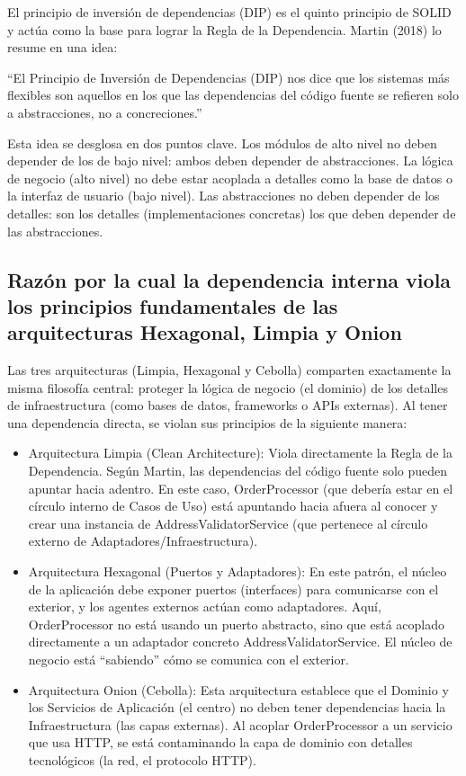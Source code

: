\documentclass[12pt, a4paper]{article}
\begin{document}
        El principio de inversión de dependencias (DIP) es el quinto principio de SOLID y actúa como la base para lograr la Regla de la Dependencia. Martin (2018) lo resume en una idea:

        “El Principio de Inversión de Dependencias (DIP) nos dice que los sistemas más flexibles son aquellos en los que las dependencias del código fuente se refieren solo a abstracciones, no a concreciones.”

        Esta idea se desglosa en dos puntos clave. Los módulos de alto nivel no deben depender de los de bajo nivel: ambos deben depender de abstracciones. La lógica de negocio (alto nivel) no debe estar acoplada a detalles como la base de datos o la interfaz de usuario (bajo nivel). Las abstracciones no deben depender de los detalles: son los detalles (implementaciones concretas) los que deben depender de las abstracciones.

        \subsection{Razón por la cual la dependencia interna viola los principios fundamentales de las arquitecturas Hexagonal, Limpia y Onion}

        Las tres arquitecturas (Limpia, Hexagonal y Cebolla) comparten exactamente la misma filosofía central: proteger la lógica de negocio (el dominio) de los detalles de infraestructura (como bases de datos, frameworks o APIs externas). Al tener una dependencia directa, se violan sus principios de la siguiente manera:
        \begin{itemize}   
            \item Arquitectura Limpia (Clean Architecture): Viola directamente la Regla de la Dependencia. Según Martin, las dependencias del código fuente solo pueden apuntar hacia adentro. En este caso, OrderProcessor (que debería estar en el círculo interno de Casos de Uso) está apuntando hacia afuera al conocer y crear una instancia de AddressValidatorService (que pertenece al círculo externo de Adaptadores/Infraestructura).
            \item Arquitectura Hexagonal (Puertos y Adaptadores): En este patrón, el núcleo de la aplicación debe exponer puertos (interfaces) para comunicarse con el exterior, y los agentes externos actúan como adaptadores. Aquí, OrderProcessor no está usando un puerto abstracto, sino que está acoplado directamente a un adaptador concreto AddressValidatorService. El núcleo de negocio está ``sabiendo'' cómo se comunica con el exterior.
            \item Arquitectura Onion (Cebolla): Esta arquitectura establece que el Dominio y los Servicios de Aplicación (el centro) no deben tener dependencias hacia la Infraestructura (las capas externas). Al acoplar OrderProcessor a un servicio que usa HTTP, se está contaminando la capa de dominio con detalles tecnológicos (la red, el protocolo HTTP).
­        \end{itemize}
\end{document}
